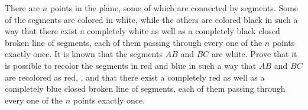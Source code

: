 There are $n$ points in the plane, some of which are connected by segments.
Some of the segments are colored in white, while the others are colored black in such a way that there exist a completely white as well as a completely black closed broken line of segments, each of them passing through every one of the $n$ points exactly once.
It is known that the segments $AB$ and $BC$ are white. Prove that it is possible to recolor the segments in red and blue in such a way that $AB$ and $BC$ are recolored as red, , and that there exist a completely red as well as a completely blue closed broken line of segments, each of them passing through every one of the $n$ points exactly once.